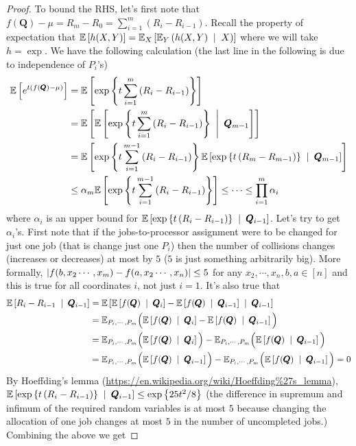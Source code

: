\begin{proof}
To bound the RHS, let's first note that $f(\pmb Q)-\mu = R_{m}-R_{0} = \sum_{i=1}^{m}(R_{i}-R_{i-1})$. Recall the property of expectation that $\E{h(X,Y)} = \mathbb{E}_{X}\left[\mathbb E_{Y}\left(h(X,Y)\st X\right)\right]$ where we will take $h=\exp$. We have the following calculation (the last line in the following is due to independence of $P_{i}$'s)
\begin{align*}
\E{e^{t(f(\pmb Q)-\mu)}} &= \E{\exp\set{t\sum_{i=1}^{m}\left(R_{i}-R_{i-1}\right)}}\\
&= \E{\E{\exp\set{t\sum_{i=1}^{m}\left(R_{i}-R_{i-1}\right)}\st \pmb Q_{m-1}}}\\
&= \E{\exp\set{t\sum_{i=1}^{m-1}\left(R_{i}-R_{i-1}\right)}\E{\exp\set{t\left(R_{m}-R_{m-1}\right)}\st \pmb Q_{m-1}}}\\
&\le \alpha_{m}\E{\exp\set{t\sum_{i=1}^{m-1}\left(R_{i}-R_{i-1}\right)}}\le \cdots\le \prod_{i=1}^{m}\alpha_{i}
\end{align*}
where $\alpha_{i}$ is an upper bound for $\E{\exp\set{t\left(R_{i}-R_{i-1}\right)}\st \pmb Q_{i-1}}$. Let's try to get $\alpha_{i}$'s. First note that if the jobs-to-processor assignment were to be changed for just one job (that is change just one $P_{i}$) then the number of collisions changes (increases or decreases) at most by $5$ ($5$ is just something arbitrarily big). More formally, $\left| f(b,x_{2}\cdots,x_{m}) - f(a,x_{2}\cdots,x_{n}) \right| \le 5$ for any $x_{2},\cdots,x_{n},b,a\in [n]$ and this is true for all coordinates $i$, not just $i=1$. It's also true that \begin{align*}
\E{R_{i}-R_{i-1}\st \pmb Q_{i-1}} &= \E{\E{f(\pmb Q)\st \pmb Q_{i}}-\E{f(\pmb Q)\st \pmb Q_{i-1}}\st \pmb Q_{i-1}} \\
&= \mathbb E_{P_{i},\cdots,P_{m}}\Big(\E{f(\pmb Q)\st \pmb Q_{i}}-\E{f(\pmb Q)\st \pmb Q_{i-1}}\Big) \\
&= \mathbb E_{P_{i},\cdots,P_{m}}\Big(\E{f(\pmb Q)\st \pmb Q_{i}}\Big) - \mathbb E_{P_{i},\cdots,P_{m}}\Big(\E{f(\pmb Q)\st \pmb Q_{i-1}}\Big)\\
&= \mathbb E_{P_{i},\cdots,P_{m}}\Big(\E{f(\pmb Q)\st \pmb Q_{i-1}}\Big) - \mathbb E_{P_{i},\cdots,P_{m}}\Big(\E{f(\pmb Q)\st \pmb Q_{i-1}}\Big) = 0
\end{align*}
By Hoeffding's lemma (\url{https://en.wikipedia.org/wiki/Hoeffding%27s_lemma}),\\
$\E{\exp\set{t\left(R_{i}-R_{i-1}\right)}\st \pmb Q_{i-1}} \le \exp\set{25t^{2}/8}$ (the difference in supremum and infimum of the required random variables is at most $5$ because changing the allocation of one job changes at most $5$ in the number of uncompleted jobs.) Combining the above we get 

\end{proof}
